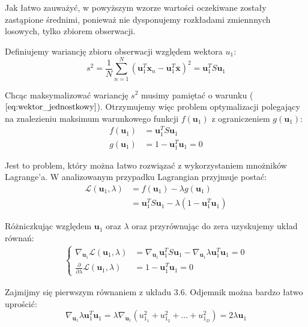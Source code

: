 \documentclass[oneside, eng]{mgr}
\newcommand{\bb}{\textbf}
\begin{document}
Jak łatwo zauważyć, w powyższym wzorze wartości oczekiwane zostały zastąpione średnimi, ponieważ nie dysponujemy rozkładami zmiennnych losowych, tylko zbiorem obserwacji.

Definiujemy wariancję zbioru obserwacji względem wektora $u_1$:
\begin{equation}
	s^2 = \frac{1}{N} \sum_{n=1}^{N}(\bb{u}_1^T \bb{x}_n - \bb{u}_1^T\overline{\bb{x}})^2 = \bb{u}_1^T S \bb{u}_1
\end{equation}

Chcąc maksymalizować wariancję $s^2$ musimy pamiętać o warunku ($\ref{eq:wektor_jednostkowy}$). Otrzymujemy więc problem optymalizacji polegający na znalezieniu maksimum warunkowego funkcji $f(\bb{u}_1)$ z ograniczeniem $g(\bb{u}_1)$:
\begin{align*}
	f(\bb{u}_1) &= \bb{u}_1^T S \bb{u}_1 \\
	g(\bb{u}_1) &= 1 - \bb{u}_1^T \bb{u}_1 = 0
\end{align*}

Jest to problem, który można łatwo rozwiązać z wykorzystaniem mnożników Lagrange'a. W analizowanym przypadku Lagrangian przyjmuje postać:
\begin{align*}
	\mathcal{L}(\bb{u}_1, \lambda) &= f(\bb{u}_1) - \lambda g(\bb{u}_1) \\
				&= \bb{u}_1^T S \bb{u}_1 - \lambda(1 - \bb{u}_1^T \bb{u}_1)
\end{align*}

Różniczkując względem $\bb{u}_1$ oraz $\lambda$ oraz przyrównując do zera uzyskujemy układ równań:
\begin{align} 
\begin{cases}
	\nabla_{\bb{u}_1} \mathcal{L} (\bb{u}_1, \lambda) &= \nabla_{\bb{u}_1} \bb{u}_1^T S \bb{u}_1 - \nabla_{\bb{u}_1} \lambda \bb{u}_1^T \bb{u}_1 = 0 \\
	\frac{\partial}{\partial \lambda} \mathcal{L} (\bb{u}_1, \lambda) &= 1 - \bb{u}_1^T \bb{u}_1 = 0
\end{cases}
\end{align}

Zajmijmy się pierwszym równaniem z układu $3.6$. Odjemnik można bardzo łatwo uprościć:
\begin{equation}
	\nabla_{\bb{u}_1} \lambda \bb{u}_1^T \bb{u}_1 = \lambda \nabla_{\bb{u}_1} 
		(u_{1_1}^2 + u_{1_2}^2 + ... + u_{1_D}^2)
	 	= 2 \lambda \bb{u}_1
\end{equation}
\end{document}
